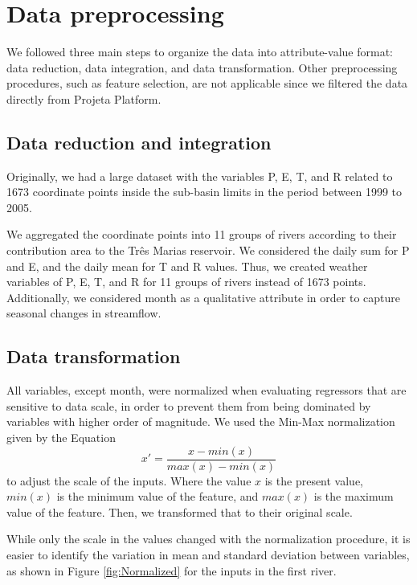 \documentclass[12pt]{article}
\begin{document}
\section{Data preprocessing}
\label{sec:DataPreprocessing}

We followed three main steps to organize the data into attribute-value format: data reduction, data integration, and data transformation. Other preprocessing procedures, such as feature selection, are not applicable since we filtered the data directly from Projeta Platform.

\subsection{Data reduction and integration}
\label{ssec:DataReductionIntegration}

Originally, we had a large dataset with the variables P, E, T, and R related to 1673 coordinate points inside the sub-basin limits in the period between 1999 to 2005.

We aggregated the coordinate points into 11 groups of rivers according to their contribution area to the Três Marias reservoir. We considered the daily sum for P and E, and the daily mean for T and R values. Thus, we created weather variables of P, E, T, and R for 11 groups of rivers instead of 1673 points. Additionally, we considered month as a qualitative attribute in order to capture seasonal changes in streamflow.

\subsection{Data transformation}
\label{sec:DataTransformation}

All variables, except month, were normalized when evaluating regressors that are sensitive to data scale, in order to prevent them from being dominated by variables with higher order of magnitude. We used the Min-Max normalization given by the Equation
    \begin{equation}
    \label{eqn:Normalization}
    x' = \frac{x-min(x)}{max(x)-min(x)}
    \end{equation}
to adjust the scale of the inputs. Where the value $x$ is the present value, $min(x)$ is the minimum value of the feature, and $max(x)$ is the maximum value of the feature. Then, we transformed that to their original scale.

While only the scale in the values changed with the normalization procedure, it is easier to identify the variation in mean and standard deviation between variables, as shown in Figure \ref{fig:Normalized} for the inputs in the first river.
\end{document}
